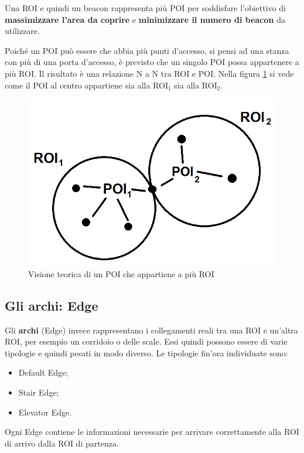 \documentclass[../ManualeSviluppatore.tex]{subfiles}
\begin{document}
	Una ROI e quindi un \gls{beacon} rappresenta più POI per soddisfare l'obiettivo di \textbf{massimizzare l'area da coprire} e \textbf{minimizzare il numero di beacon} da utilizzare.
	
	Poiché un POI può essere che abbia più punti d'accesso, si pensi ad una stanza con più di una porta d'accesso, è previsto che un singolo POI possa appartenere a più ROI. Il risultato è una relazione N a N tra ROI e POI. Nella figura \ref{fig:ROIePOI-NtoN} si vede come il POI al centro appartiene sia alla ROI$_1$ sia alla ROI$_2$.
	
	\begin{figure} [h]
		\centering
		\includegraphics[scale=0.4]{img/POIeROI-NtoN}
		\caption{Visione teorica di un POI che appartiene a più ROI}
		\label{fig:ROIePOI-NtoN}
	\end{figure}
	
	
	\subsection{Gli archi: Edge}
	
	Gli \textbf{archi} (Edge) invece rappresentano i collegamenti reali tra una ROI e un'altra ROI, per esempio un corridoio o delle scale.
	Essi quindi possono essere di varie tipologie e quindi pesati in modo diverso. Le tipologie fin'ora individuate sono:
	\begin{itemize}
		\item Default Edge;
		\item Stair Edge;
		\item Elevator Edge.
	\end{itemize}
	Ogni Edge contiene le informazioni necessarie per arrivare correttamente alla ROI di arrivo dalla ROI di partenza.
	
\end{document}
